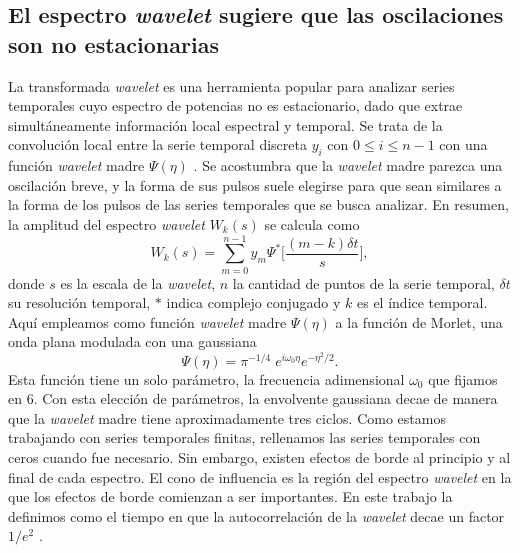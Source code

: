 \documentclass[./main.tex]{subfiles}
\begin{document}
\subsection{El espectro \textit{wavelet} sugiere que las oscilaciones son no estacionarias}

La transformada \textit{wavelet} es una herramienta popular para analizar series temporales cuyo espectro de potencias no es estacionario, dado que extrae simultáneamente información local espectral y temporal.  Se trata de la convolución local entre la serie temporal discreta $y_i$ con $0\leq i \leq n-1$ con una función \textit{wavelet} madre $\Psi(\eta)$ \cite{Torrence1998}. Se acostumbra que la \textit{wavelet} madre parezca una oscilación breve, y la forma de sus pulsos suele elegirse para que sean similares a la forma de los pulsos de las series temporales que se busca analizar. En resumen, la amplitud del espectro \textit{wavelet} $W_k(s)$ se calcula como
\begin{equation}
    W_k(s) = \sum_{m=0}^{n-1} y_m \Psi^* \Big[ \frac{(m-k) \delta t}{s}\Big], 
 \end{equation}
donde $s$ es la escala de la \textit{wavelet}, $n$ la cantidad de puntos de la serie temporal, $\delta t$ su resolución temporal, $*$ indica complejo conjugado y $k$ es el índice temporal. Aquí empleamos como función \textit{wavelet} madre $\Psi(\eta)$ a la función de Morlet, una onda plana modulada con una gaussiana
\begin{equation}
 \Psi(\eta) = \pi^{-1/4} \; e^{i\omega_0 \eta } e^{-\eta^2 / 2}.
\end{equation}
Esta función tiene un solo parámetro, la frecuencia adimensional $\omega_0$ que fijamos en $6$. Con esta elección de parámetros, la envolvente gaussiana decae de manera que la \textit{wavelet} madre tiene aproximadamente tres ciclos. Como estamos trabajando con series temporales finitas, rellenamos las series temporales con ceros cuando fue necesario. Sin embargo, existen efectos de borde al principio y al final de cada espectro. El cono de influencia es la región del espectro \textit{wavelet} en la que los efectos de borde comienzan a ser importantes. En este trabajo la definimos como el tiempo en que la autocorrelación de la \textit{wavelet} decae un factor $1/e^2$ \cite{Torrence1998}. 
\end{document}
